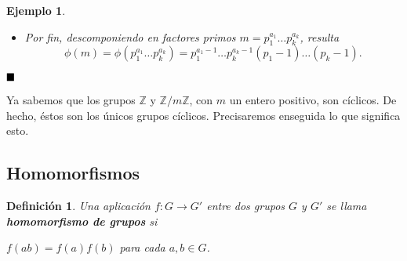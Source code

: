 \documentclass[12pt]{article}
\newtheorem{definition}[theorem]{Definición}
\newtheorem{example}{Ejemplo}[theorem]
\begin{document}
\begin{example}
\begin{enumerate}
\begin{itemize}
Si $mcd(a,mn) \neq 1$, existirá un primo $p$ que dividirá a ambos. Como $p$ es primo y divide a $mn$, divide a uno de ellos, digamos $m$. Entonces también divide a $$a - yum = xvn,$$ y por ello $p$ ha de dividir a $x, v$ o $n$. Como $mcd(m,x) = mcd(m,n)=1$, se sigue que $p$ divide a $v$. En tal caso dividirá a $$um + vn = 1,$$ lo cual es absurdo. Por lo tanto, $a + mn\mathbb{Z} \in \mathbb{Z}_{mn}^{\ast}$. Como $$a - x = yum + x(vn- 1) = yum - xum \in m\mathbb{Z},$$ $$a - y = xvn + y(um-1) = xvn -yvn \in n\mathbb{Z},$$ y así tenemos que $$f(a + mn\mathbb{Z}) = (a + m\mathbb{Z}, a + n\mathbb{Z}) = (x + m\mathbb{Z}, y + n\mathbb{Z}).$$
\item Por fin, descomponiendo en factores primos $m = p_{1}^{a_{1}} \ldots p_{k}^{a_{k}}$, resulta $$\phi(m) = \phi(p_{1}^{a_{1}} \ldots p_{k}^{a_{k}}) = p_{1}^{a_{1}-1} \ldots p_{k}^{a_{k}-1}(p_{1}-1) \ldots (p_{k}-1).$$
\end{itemize}

\end{enumerate}
\end{example}

$\hfill \blacksquare$

Ya sabemos que los grupos $\mathbb{Z}$ y $\mathbb{Z}/m\mathbb{Z}$, con $m$ un entero positivo, son cíclicos. De hecho, éstos son los únicos grupos cíclicos. Precisaremos enseguida lo que significa esto.

\subsection{Homomorfismos}

\begin{definition}Una aplicación $f\colon G \longrightarrow  G'$ entre dos grupos $G$ y $G'$ se llama \textbf{homomorfismo de grupos} si
\begin{center}
$f(ab) = f(a)f(b)$ para cada $a,b \in G$.
\end{center}
\end{definition}
\end{document}
